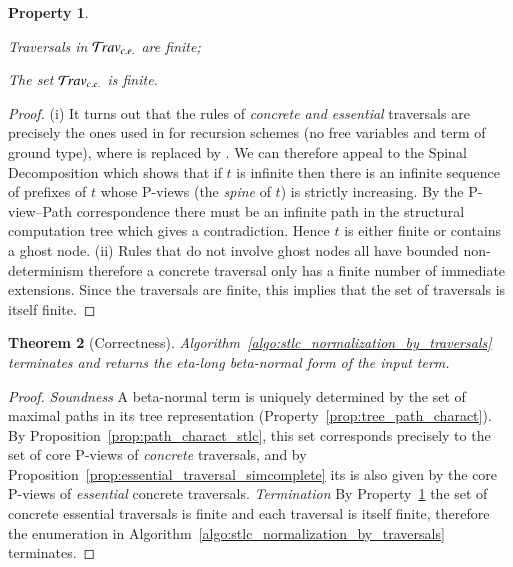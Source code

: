 \documentclass{elsarticle}
\theoremstyle{plain}
\newtheorem{theorem}{Theorem}[section]
\newtheorem{property}[theorem]{Property}
\theoremstyle{definition}
\theoremstyle{remark}
\newcommand{\travsetcones}{{\travset_{c.e.}}} %
\begin{document}
\begin{property}
    \label{prop:concrete_essential_trav_finite}
    \begin{enumerate*}
        \item[(i)] Traversals in $\travsetcones$ are finite;
        \item[(ii)] The set $\travsetcones$ is finite.
    \end{enumerate*}
    \end{property}
    \begin{proof}
    (i) It turns out that the rules of \emph{concrete and essential} traversals are precisely the ones used in \cite{OngLics2006} for recursion schemes (no free variables and term of ground type), where  is replaced by . We can therefore appeal to the Spinal Decomposition
    \cite[Lemma 8]{OngLics2006} which shows that if $t$ is infinite then there is an infinite sequence of prefixes of $t$ whose P-views (the \emph{spine} of $t$) is strictly increasing. By the P-view--Path correspondence there must be an infinite path in the structural computation tree which gives a contradiction. Hence $t$ is either finite or contains a ghost node.
    (ii) Rules that do not involve ghost nodes all have bounded non-determinism therefore a concrete traversal only has a finite number of immediate extensions. Since the traversals are finite, this implies that the set of traversals is itself finite.
\end{proof}

\begin{theorem}[Correctness]
Algorithm~\ref{algo:stlc_normalization_by_traversals} terminates and returns the eta-long beta-normal form of the input term.
\end{theorem}
\begin{proof}
\emph{Soundness} A beta-normal term is uniquely determined by the set of maximal paths in its tree representation (Property~\ref{prop:tree_path_charact}). By Proposition~\ref{prop:path_charact_stlc}, this set corresponds precisely to the set of core P-views of \emph{concrete} traversals,
and by Proposition~\ref{prop:essential_traversal_simcomplete} its is also given by the core P-views of \emph{essential} concrete traversals.
\emph{Termination} By Property~\ref{prop:concrete_essential_trav_finite} the set of concrete essential traversals is finite and each traversal is itself finite, therefore the enumeration in Algorithm~\ref{algo:stlc_normalization_by_traversals} terminates.
\end{proof}
\end{document}
